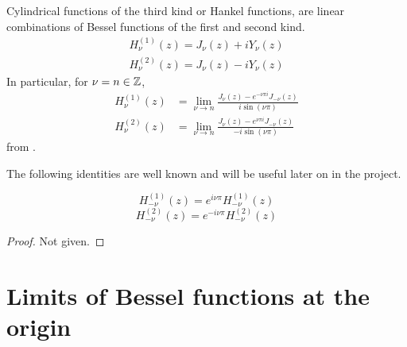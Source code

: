 \begin{defn}\label{defn:hankel_func}
  Cylindrical functions of the third kind or Hankel functions, are linear combinations of Bessel functions of the first and second kind.
    \begin{align*}
        H^{(1)}_\nu(z) = J_\nu(z) + i Y_\nu(z)\\
        H^{(2)}_\nu(z) = J_\nu(z) - i Y_\nu(z)
    \end{align*}
  In particular, for $\nu = n \in \mathbb{Z}$,
    \begin{align*}
      H^{(1)}_\nu(z)
        &= \lim_{\nu \rightarrow n} \frac{J_{\nu}(z) - e^{-\nu\pi i} J_{-\nu}(z)}{i \sin(\nu \pi)} \\
      H^{(2)}_\nu(z)
        &= \lim_{\nu \rightarrow n} \frac{J_{\nu}(z) - e^{\nu\pi i} J_{-\nu}(z)}{- i \sin(\nu \pi)}
    \end{align*}
  from \cite{karmazina19cylinderfunc}.
\end{defn}

The following identities are well known \parencite{karmazina19cylinderfunc} and will be useful later on in the project.

\begin{propn}\label{propn:hankel_identities}
  \[ H^{(1)}_{-\nu}(z) = e^{i\nu\pi}H^{(1)}_{-\nu}(z)\]
  \[ H^{(2)}_{-\nu}(z) = e^{-i\nu\pi}H^{(2)}_{-\nu}(z) \]
\end{propn}
\begin{proof}
  Not given.
\end{proof}


\section{Limits of Bessel functions at the origin}\label{ss:limits_of_bessel_functions}

